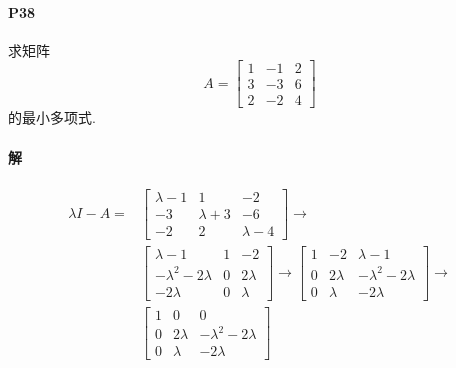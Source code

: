 \documentclass[12pt, a4paper, oneside, fontset=none]{ctexart}
\begin{document}
\paragraph*{P38} 求矩阵
\begin{equation*}
    A = \begin{bmatrix}
        1 & -1 & 2 \\
        3 & -3 & 6 \\
        2 & -2 & 4
    \end{bmatrix}
\end{equation*}
的最小多项式.

\paragraph*{解}
\begin{align*}
    \lambda I - A = & \begin{bmatrix}
                          \lambda - 1 & 1           & -2          \\
                          -3          & \lambda + 3 & -6          \\
                          -2          & 2           & \lambda - 4
                      \end{bmatrix} \to                 \\
                    & \begin{bmatrix}
                          \lambda - 1           & 1 & -2       \\
                          -\lambda^2 - 2\lambda & 0 & 2\lambda \\
                          -2\lambda             & 0 & \lambda
                      \end{bmatrix} \to  \begin{bmatrix}
                                             1 & -2       & \lambda-1             \\
                                             0 & 2\lambda & -\lambda^2 - 2\lambda \\
                                             0 & \lambda  & -2\lambda
                                         \end{bmatrix} \to \\
                    & \begin{bmatrix}
                          1 & 0        & 0                    \\
                          0 & 2\lambda & -\lambda^2 -2\lambda \\
                          0 & \lambda  & -2\lambda

\end{bmatrix}
\end{align*}
\end{document}
